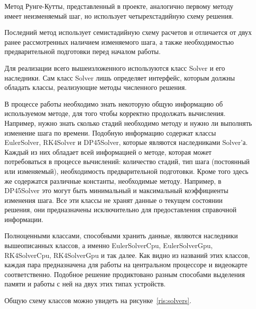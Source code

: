 \documentclass[a4paper, 14pt]{extarticle}
\theoremstyle{definition}
\begin{document}
\par Метод Рунге-Кутты, представленный в проекте, аналогично первому методу имеет неизменяемый шаг, но использует четырехстадийную схему решения.

\par Последний метод использует семистадийную схему расчетов и отличается от двух ранее рассмотренных наличием изменяемого шага, а также необходимостью предварительной подготовки перед началом работы.

\par Для реализации всего вышеизложенного используются класс Solver и его наследники. Сам класс Solver лишь определяет интерфейс, которым должны обладать классы, реализующие методы численного решения.

\par В процессе работы необходимо знать некоторую общую информацию об используемом методе, для того чтобы корректно продолжать вычисления. Например, нужно знать сколько стадий необходимо методу и нужно ли выполнять изменение шага по времени. Подобную информацию содержат классы EulerSolver, RK4Solver и DP45Solver, которые являются наследниками Solver'а. Каждый из них обладает всей информацией о методе, которая может потребоваться в процессе вычислений: количество стадий, тип шага (постоянный или изменяемый), необходимость предварительной подготовки. Кроме того здесь же содержатся различные константы, необходимые методу. Например, в DP45Solver это могут быть минимальный и максимальный коэффициенты изменения шага. Все эти классы не хранят данные о текущем состоянии решения, они предназначены исключительно для предоставления справочной информации.

\par Полноценными классами, способными хранить данные, являются наследники вышеописанных классов, а именно EulerSolverCpu, EulerSolverGpu, RK4SolverCpu, RK4SolverGpu и так далее. Как видно из названий этих классов, каждая пара предназначена для работы на центральном процессоре и видеокарте соответственно. Подобное решение продиктовано разным способами выделения памяти и работы с ней на двух этих типах устройств.

\par Общую схему классов можно увидеть на рисунке~\ref{ris:solvers}.
\end{document}

